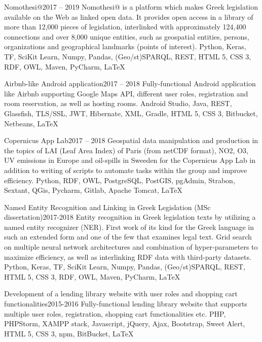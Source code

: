 \begin{projects}
	\project
	{Nomothesi@}{2017 – 2019}
	{}
	{Nomothesi@ is a platform which makes Greek legislation available on the Web as linked open data. It provides open access in a library of more than 12,000 pieces of legislation, interlinked with approximately 124,400 connections and over 8,000 unique entities, such as geospatial entities, persons, organizations and geographical landmarks (points of interest).}
	{Python, Keras, TF, SciKit Learn, Numpy, Pandas, (Geo/st)SPARQL, REST, HTML 5, CSS 3, RDF, OWL, Maven, PyCharm, \LaTeX}

	\project
	{Airbnb-like Android application}{2017 – 2018}
	{}
	{Fully-functional Android application like Airbnb supporting Google Maps API, different user roles, registration and room reservation, as well as hosting rooms.}
	{Android Studio, Java, REST, Glassfish, TLS/SSL, JWT, Hibernate, XML, Gradle, HTML 5, CSS 3, Bitbucket, Netbeans, \LaTeX}

	\project
	{Copernicus App Lab}{2017 – 2018}
	{}
	{Geospatial data manipulation and production in the topics of LAI (Leaf Area Index) of Paris (from netCDF format), NO2, O3, UV emissions in Europe and oil-spills in Sweeden for the Copernicus App Lab in addition to writing of scripts to automate tasks within the group and improve efficiency.}
	{Python, RDF, OWL, PostgreSQL, PostGIS, pgAdmin, Strabon, Sextant, QGis, Pycharm, Gitlab, Apache Tomcat, \LaTeX}

	\project
	{Named Entity Recognition and Linking in Greek Legislation (MSc dissertation)}{2017-2018}
	{}
	{Entity recognition in Greek legislation texts by utilizing a named entity recognizer (NER). First work of its kind for the Greek language in such an extended form and one of the few that examines legal text. Grid search on multiple neural network architectures and combination of hyper-parameters to maximize efficiency, as well as interlinking RDF data with third-party datasets.}
	{Python, Keras, TF, SciKit Learn, Numpy, Pandas, (Geo/st)SPARQL, REST, HTML 5, CSS 3, RDF, OWL, Maven, PyCharm, \LaTeX}

	\newpage

	\project
	{Development of a lending library website with user roles and shopping cart functionalities}{2015-2016}
	{}
	{Fully-functional lending library website that supports multiple user roles, registration, shopping cart functionalities etc.}
	{PHP, PHPStorm, XAMPP stack, Javascript, jQuery, Ajax, Bootstrap, Sweet Alert, HTML 5, CSS 3, npm, BitBucket, \LaTeX}


\end{projects}
